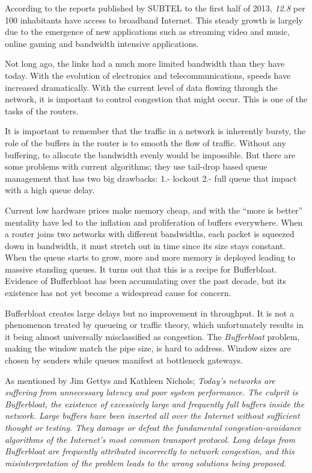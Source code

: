 According to the reports published by SUBTEL to the first half of 2013,
\textit{12.8} per 100 inhabitants have access to broadband
Internet\cite{OCDE}.  This steady growth is largely due to the emergence of
new applications such as streaming video and music, online gaming and
bandwidth intensive applications.

Not long ago, the links had a much more limited bandwidth than they have
today. With the evolution of electronics and telecommunications,
speeds have increased dramatically. With the current level of data flowing
through the network, it is important to control congestion that
might occur. This is one of the tasks of the routers.

It is important to remember that the traffic in a network is inherently
bursty, the role of the buffers in the router is to smooth the flow of
traffic. Without any buffering, to allocate the bandwidth evenly would be
impossible. But there are some problems with current algorithms; they use
tail-drop based queue management that has two big drawbacks: 1.- lockout 2.-
full queue that impact with a high queue delay.

Current low hardware prices make memory cheap,
and with the ``more is better'' mentality have led to the inflation and
proliferation of buffers everywhere\cite{NicholsJacobsonCQD}. When a router
joins two networks with different bandwidths, each packet is squeezed down in
bandwidth, it must stretch out in time since its size stays constant. When
the queue starts to grow, more and more memory is deployed leading to
massive standing queues. It turns out that this is a recipe for Bufferbloat.
Evidence of Bufferbloat has been accumulating over the past decade, but its
existence has not yet become a widespread cause for concern.

Bufferbloat creates large delays but no improvement in throughput. It is not a
phenomenon treated by queueing or traffic theory, which unfortunately results
in it being almost universally misclassified as congestion. The \textit{\gls{Bufferbloat}}
problem, making the window match the pipe size, is hard to address. Window
sizes are chosen by senders while queues manifest at bottleneck gateways.


As mentioned by Jim Gettys and Kathleen Nichols;
\textit{Today's networks are suffering from unnecessary latency and poor
system performance. The culprit is Bufferbloat, the existence of excessively
large and frequently full buffers inside the network. Large buffers have been
inserted all over the Internet without sufficient thought or testing. They
damage or defeat the fundamental congestion-avoidance algorithms of the
Internet's most common transport protocol. Long delays from Bufferbloat are
frequently attributed incorrectly to network congestion, and this
misinterpretation of the problem leads to the wrong solutions being
proposed}\cite{GettysNichols}.


